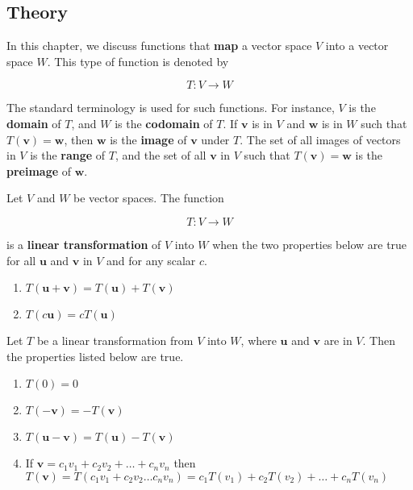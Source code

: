 \documentclass{report}
\begin{document}
\subsection{Theory}

\begin{tcolorbox}[title = Images and Preimages of Functions]
	In this chapter, we discuss functions that \textbf{map} a vector space $V$ into a vector space $W$. This type of function is denoted by 
	
	$$
	T: V \to W
	$$
	
	The standard terminology is used for such functions. For instance, $V$ is the \textbf{domain} of $T$, and $W$ is the \textbf{codomain} of $T$. If $\bm{v}$ is in $V$ and $\bm{w}$ is in $W$ such that $T(\bm{v}) = \bm{w}$, then $\bm{w}$ is the \textbf{image} of $\bm{v}$ under $T$. The set of all images of vectors in $V$ is the \textbf{range} of $T$, and the set of all $\bm{v}$ in $V$ such that $T(\bm{v}) = \bm{w}$ is the \textbf{preimage} of $\bm{w}$.
\end{tcolorbox}

\begin{tcolorbox}[title = Definition of a Linear Transformation]
	Let $V$ and $W$ be vector spaces. The function
	
	$$
	T: V \to W
	$$
	
	is a \textbf{linear transformation} of $V$ into $W$ when the two properties below are true for all $\bm{u}$ and $\bm{v}$ in $V$ and for any scalar $c$.
	\begin{enumerate}
		\item $T(\bm{u} + \bm{v}) = T(\bm{u}) + T(\bm{v})$
		\item  $T(c\bm{u}) = cT(\bm{u})$
	\end{enumerate}
\end{tcolorbox}

\begin{tcolorbox}[title = Properties of Linear Transformations]
	Let $T$ be a linear transformation from $V$ into $W$, where $\bm{u}$ and $\bm{v}$ are in $V$. Then the properties listed below are true.
	\begin{enumerate}
		\item $T(0) = 0$
		\item $T(-\bm{v}) = -T(\bm{v})$
		\item $T(\bm{u} - \bm{v}) = T(\bm{u}) - T(\bm{v})$
		\item If $\bm{v} = c_1 v_1 + c_2 v_2 + \hdots + c_n v_n$ then $T(\bm{v}) = T(c_1 v_1 + c_2 v_2 \hdots c_n v_n) = c_1 T(v_1) + c_2 T(v_2) + \hdots + c_n T(v_n)$
		
	\end{enumerate}
\end{tcolorbox}
\end{document}
